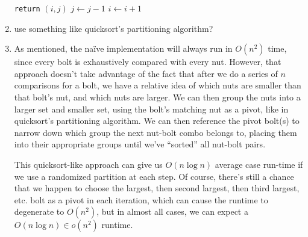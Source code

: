 \documentclass[12pt]{article}
\begin{document}
\begin{enumerate}
\begin{algorithm}
\begin{algorithmic}
                    \State \texttt{return} $(i, j)$
                \Else
                        \State $j \gets j - 1$
                    \Else
                        \State $i \gets i + 1$
                    \EndIf
                \EndIf
            \EndWhile
        \end{algorithmic}
    \end{algorithm}
    
    \item use something like quicksort's partitioning algorithm?
    
    \item As mentioned, the naïve implementation will always run in $O(n^2)$ time, since every bolt is exhaustively 
    compared with every nut. However, that approach doesn't take advantage of the fact that after we do a series of $n$ 
    comparisons for a bolt, we have a relative idea of which nuts are smaller than that bolt's nut, and which nuts are 
    larger. We can then group the nuts into a larger set and smaller set, using the bolt's matching nut as a pivot, like 
    in quicksort's partitioning algorithm. We can then reference the pivot bolt(s) to narrow down which group the next nut-bolt 
    combo belongs to, placing them into their appropriate groups until we've ``sorted'' all nut-bolt pairs.

    This quicksort-like approach can give us $O(n\log n)$ average case run-time if we use a randomized partition at each 
    step. Of course, there's still a chance that we happen to choose the largest, then second largest, then third largest, 
    etc. bolt as a pivot in each iteration, which can cause the runtime to degenerate to $O(n^2)$, but in almost all cases, we can expect 
    a $O(n\log n) \in o(n^2)$ runtime.
\end{enumerate}
\end{document}
